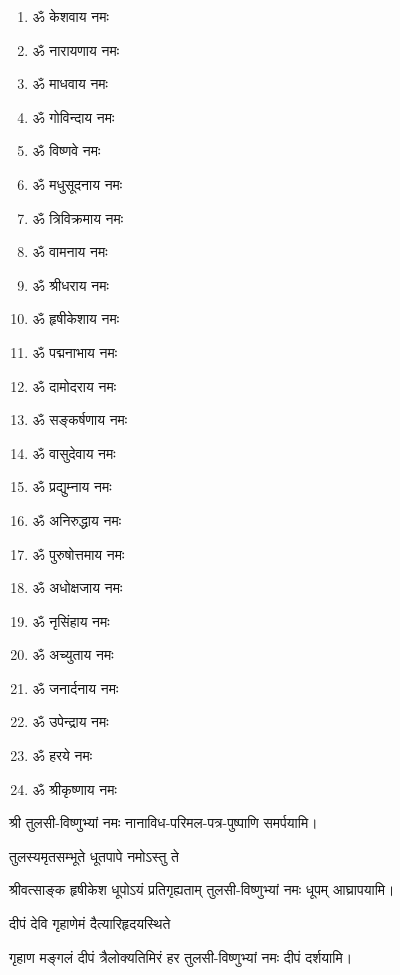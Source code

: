 \begin{multicols}{2}
\begin{enumerate}
\item ॐ केशवाय नमः
\item ॐ नारायणाय नमः
\item ॐ माधवाय नमः
\item ॐ गोविन्दाय नमः
\item ॐ विष्णवे नमः
\item ॐ मधुसूदनाय नमः
\item ॐ त्रिविक्रमाय नमः
\item ॐ वामनाय नमः
\item ॐ श्रीधराय नमः
\item ॐ हृषीकेशाय नमः
\item ॐ पद्मनाभाय नमः
\item ॐ दामोदराय नमः
\item ॐ सङ्कर्षणाय नमः
\item ॐ वासुदेवाय नमः
\item ॐ प्रद्युम्नाय नमः
\item ॐ अनिरुद्धाय नमः
\item ॐ पुरुषोत्तमाय नमः
\item ॐ अधोक्षजाय नमः
\item ॐ नृसिंहाय नमः
\item ॐ अच्युताय नमः
\item ॐ जनार्दनाय नमः
\item ॐ उपेन्द्राय नमः
\item ॐ हरये नमः
\item ॐ श्रीकृष्णाय नमः
\end{enumerate}
\end{multicols}

\begingroup
\setlength{\columnseprule}{1pt}
\let\chapt\sect


श्री तुलसी-विष्णुभ्यां नमः नानाविध-परिमल-पत्र-पुष्पाणि समर्पयामि।
\endgroup



{तुलस्यमृतसम्भूते धूतपापे नमोऽस्तु ते}

{श्रीवत्साङ्क हृषीकेश धूपोऽयं प्रतिगृह्यताम्}
\hfill{}तुलसी-विष्णुभ्यां नमः धूपम् आघ्रापयामि।

{दीपं देवि गृहाणेमं दैत्यारिहृदयस्थिते}

{गृहाण मङ्गलं दीपं त्रैलोक्यतिमिरं हर}
\hfill{}तुलसी-विष्णुभ्यां नमः दीपं दर्शयामि।

